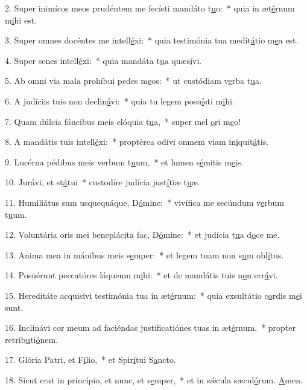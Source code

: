 2. Super inimícos meos prudéntem me fecísti mandáto t\uline{u}o:~* quia in æt\uline{é}rnum m\uline{i}hi est.\par 
3. Super omnes docéntes me intell\uline{é}xi:~* quia testimónia tua medit\uline{á}tio m\uline{e}a est.\par 
4. Super senes intell\uline{é}xi:~* quia mandáta t\uline{u}a quæs\uline{í}vi.\par 
5. Ab omni via mala prohíbui pedes m\uline{e}os:~* ut custódiam v\uline{e}rba t\uline{u}a.\par 
6. A judíciis tuis non declin\uline{á}vi:~* quia tu legem posu\uline{í}sti m\uline{i}hi.\par 
7. Quam dúlcia fáucibus meis elóquia t\uline{u}a,~* super mel \uline{o}ri m\uline{e}o!\par 
8. A mandátis tuis intell\uline{é}xi:~* proptérea odívi omnem viam in\uline{i}quit\uline{á}tis.\par 
9. Lucérna pédibus meis verbum t\uline{u}um,~* et lumen s\uline{é}mitis m\uline{e}is.\par 
10. Jurávi, et st\uline{á}tui~* custodíre judícia just\uline{í}tiæ t\uline{u}æ.\par 
11. Humiliátus sum usquequáque, D\uline{ó}mine:~* vivífica me secúndum v\uline{e}rbum t\uline{u}um.\par 
12. Voluntária oris mei beneplácita fac, D\uline{ó}mine:~* et judícia t\uline{u}a d\uline{o}ce me.\par 
13. Anima mea in mánibus meis s\uline{e}mper:~* et legem tuam non s\uline{u}m obl\uline{í}tus.\par 
14. Posuérunt peccatóres láqueum m\uline{i}hi:~* et de mandátis tuis n\uline{o}n err\uline{á}vi.\par 
15. Hereditáte acquisívi testimónia tua in æt\uline{é}rnum:~* quia exsultátio c\uline{o}rdis m\uline{e}i sunt.\par 
16. Inclinávi cor meum ad faciéndas justificatiónes tuas in æt\uline{é}rnum,~* propter retrib\uline{u}ti\uline{ó}nem.\par 
17. Glória Patri, et F\uline{í}lio,~* et Spir\uline{í}tui S\uline{a}ncto.\par 
18. Sicut erat in princípio, et nunc, et s\uline{e}mper,~* et in sǽcula sæcul\uline{ó}rum. \uline{A}men.\par 
